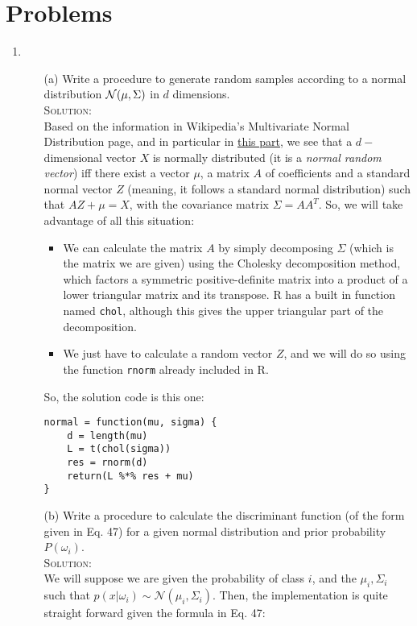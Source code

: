 \documentclass[10pt]{article}
\begin{document}
\section{Problems}
\begin{enumerate}
  \item
  \begin{enumerate}
    \item[(a)] Write a procedure to generate random samples according to a normal distribution $\mathcal N(\boldmath\mu,\boldmath\Sigma)$ in $d$ dimensions.\\
        {\scshape Solution:}\\
        Based on the information in Wikipedia's Multivariate Normal Distribution page, and in particular in \href{https://en.wikipedia.org/wiki/Multivariate_normal_distribution#Normal_random_vector}{this part}, we see that a $d-$dimensional vector $X$ is normally distributed (it is a \textit{normal random vector}) iff there exist a vector $\mu$, a matrix $A$ of coefficients and a standard normal vector $Z$ (meaning, it follows a standard normal distribution) such that $AZ + \mu = X$, with the covariance matrix $\Sigma=AA^T$. So, we will take advantage of all this situation:
        \begin{itemize}
          \item We can calculate the matrix $A$ by simply decomposing $\Sigma$ (which is the matrix we are given) using the Cholesky decomposition method, which factors a symmetric positive-definite matrix into a product of a lower triangular matrix and its transpose. R has a built in function named \verb|chol|, although this gives the upper triangular part of the decomposition.
          \item We just have to calculate a random vector $Z$, and we will do so using the function \verb|rnorm| already included in R.
        \end{itemize}
        So, the solution code is this one:
        \begin{verbatim}
normal = function(mu, sigma) {
    d = length(mu)
    L = t(chol(sigma))
    res = rnorm(d)
    return(L %*% res + mu)
}
        \end{verbatim}
    \item[(b)] Write a procedure to calculate the discriminant function (of the form given in Eq. 47) for a given normal distribution and prior probability $P(\omega_i)$.\\
        {\scshape Solution:}\\
        We will suppose we are given the probability of class $i$, and the $\mu_i,\Sigma_i$ such that $p(x|\omega_i)\sim\mathcal N(\mu_i,\Sigma_i)$. Then, the implementation is quite straight forward given the formula in Eq. 47:

\end{enumerate}
\end{enumerate}
\end{document}

